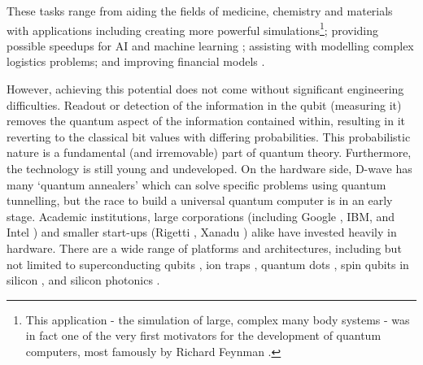 

These tasks range from aiding the fields of medicine, chemistry and materials with applications including creating more powerful simulations\footnote{This application - the simulation of large, complex many body systems - was in fact one of the very first motivators for the development of quantum computers, most famously by Richard Feynman \cite{Feynman1982simulating}.}\cite{Georgescu2014Sim}; providing possible speedups for AI and machine learning \cite{Biamonte2017QML}; assisting with modelling complex logistics problems; and improving financial models \cite{Schaden2002quantumfinance}.

However, achieving this potential does not come without significant engineering difficulties. Readout or detection of the information in the qubit (measuring it) removes the quantum aspect of the information contained within, resulting in it reverting to the classical bit values with differing probabilities. This probabilistic nature is a fundamental (and irremovable) part of quantum theory. Furthermore, the technology is still young and undeveloped. On the hardware side, D-wave has many `quantum annealers' which can solve specific problems using quantum tunnelling, but the race to build a universal quantum computer is in an early stage. Academic institutions, large corporations (including Google \cite{googleqai, bristlecone}, IBM, \cite{ibmqweb} and Intel \cite{intelqcomp}) and smaller start-ups (Rigetti \cite{rigettihome}, Xanadu \cite{Xanadu}) alike have invested heavily in hardware. There are a wide range of platforms and architectures, including but not limited to superconducting qubits \cite{bristlecone}, ion traps \cite{steane1997ionTrap}, quantum dots \cite{loss1998quantumdots}, spin qubits in silicon \cite{intelSCspinqubits}, and silicon photonics \cite{RudolphSiliconPhotonicsQC}. 

